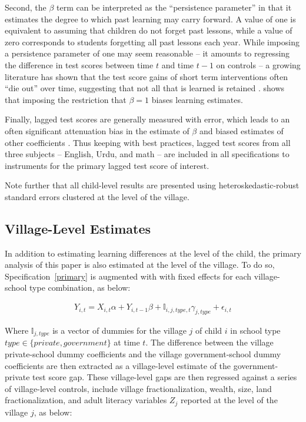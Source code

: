 \documentclass[Eubank_pk_ethnic_sorting.tex]{subfiles}
\begin{document}
Second, the $\beta$ term can be interpreted as the ``persistence parameter'' in that it estimates the degree to which past learning may carry forward. A value of one is equivalent to assuming that children do not forget past lessons, while a value of zero corresponds to students forgetting all past lessons each year. While imposing a persistence parameter of one may seem reasonable -- it amounts to regressing the difference in test scores between time $t$ and time $t-1$ on controls -- a growing literature has shown that the test score gains of short term interventions often ``die out'' over time, suggesting that not all that is learned is retained \citep{Banerjee:2007wx, Glewwe:2010hj,Currie:1995wo, Rothstein:2010bk}. \cite{Andrabi:2011hl} shows that imposing the restriction that $\beta=1$ biases learning estimates. 

Finally, lagged test scores are generally measured with error, which leads to an often significant attenuation bias in the estimate of $\beta$ and biased estimates of other coefficients \citep{Kane:2002if,Chay:2005wu,Andrabi:2011hl}. Thus keeping with best practices, lagged test scores from all three subjects -- English, Urdu, and math -- are included in all specifications to instruments for the primary lagged test score of interest. 

Note further that all child-level results are presented using heteroskedastic-robust standard errors clustered at the level of the village.

\subsection{Village-Level Estimates}\label{}

In addition to estimating learning differences at the level of the child, the primary analysis of this paper is also estimated at the level of the village. To do so, Specification~\ref{primary} is augmented with with fixed effects for each village-school type combination, as below:

\begin{eqnarray*}
	Y_{i,t}=X_{i,t}\alpha+Y_{i,t-1}\beta + \mathbb{I}_{i,j,type,t}\gamma_{j, type}+\epsilon_{i,t}
\end{eqnarray*}

Where $\mathbb{I}_{j, type}$ is a vector of dummies for the village $j$ of child $i$ in school type $type \in \{private, government\}$ at time $t$. The difference between the village private-school dummy coefficients and the village government-school dummy coefficients are then extracted as a village-level estimate of the government-private test score gap. These village-level gaps are then regressed against a series of village-level controls, include village fractionalization, wealth, size, land fractionalization, and adult literacy variables $Z_{j}$ reported at the level of the village $j$, as below:
\end{document}
